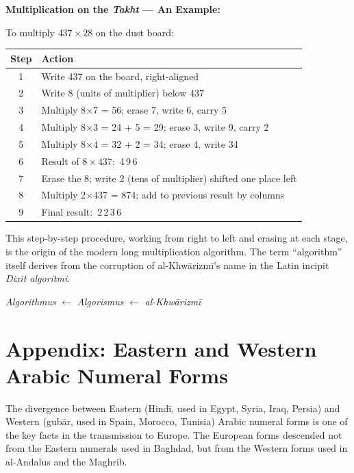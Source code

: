 \documentclass[11pt,a4paper]{article}
\newenvironment{enhancednote}{%
  \begin{tcolorbox}[colback=enhancedbg,colframe=notecolor,boxrule=1pt,
    left=10pt,right=10pt,top=8pt,bottom=8pt,
    title={\textbf{Enhanced Edition Note}},fonttitle=\bfseries\color{notecolor}]
}{\end{tcolorbox}}
\begin{document}
\textbf{Multiplication on the \textit{Takht} --- An Example:}

To multiply $437 \times 28$ on the dust board:

\begin{center}
\begin{tabular}{|c|l|}
\hline
\textbf{Step} & \textbf{Action} \\
\hline
1 & Write 437 on the board, right-aligned \\
2 & Write 8 (units of multiplier) below 437 \\
3 & Multiply 8$\times$7 = 56; erase 7, write 6, carry 5 \\
4 & Multiply 8$\times$3 = 24 + 5 = 29; erase 3, write 9, carry 2 \\
5 & Multiply 8$\times$4 = 32 + 2 = 34; erase 4, write 34 \\
6 & Result of $8 \times 437$: \quad 3\,4\,9\,6 \\
7 & Erase the 8; write 2 (tens of multiplier) shifted one place left \\
8 & Multiply 2$\times$437 = 874; add to previous result by columns \\
9 & Final result: \quad 1\,2\,2\,3\,6 \\
\hline
\end{tabular}
\end{center}

This step-by-step procedure, working from right to left and erasing at each stage, is the origin of the modern long multiplication algorithm. The term ``algorithm'' itself derives from the corruption of al-Khw\=arizm\=i's name in the Latin incipit \textit{Dixit algoritmi}.

\vspace{0.5em}
\begin{center}
\textit{Algorithmus} $\leftarrow$ \textit{Algorismus} $\leftarrow$ \textit{al-Khw\=arizm\=i}
\end{center}

\newpage

\section*{Appendix: Eastern and Western Arabic Numeral Forms}

\begin{enhancednote}
The divergence between Eastern (Hind\=i, used in Egypt, Syria, Iraq, Persia) and Western (gub\=ar, used in Spain, Morocco, Tunisia) Arabic numeral forms is one of the key facts in the transmission to Europe. The European forms descended not from the Eastern numerals used in Baghdad, but from the Western forms used in al-Andalus and the Maghrib.
\end{enhancednote}
\end{document}

